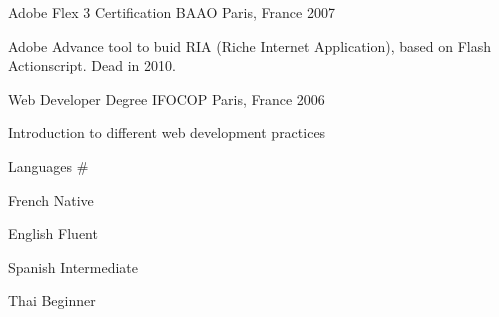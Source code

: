 

\begin{cventries}

  \cventry
    {Adobe Flex 3 Certification} %
    {BAAO} %
    {Paris, France} %
    {2007} %
    {
      \begin{cvitems} %
        \item {Adobe Advance tool to buid RIA (Riche Internet Application), based on Flash Actionscript. Dead in 2010.}
      \end{cvitems}
    }
    { } %
  \cventry
    {Web Developer Degree} %
    {IFOCOP} %
    {Paris, France} %
    {2006} %
    {
      \begin{cvitems} %
        \item {Introduction to different web development practices}
      \end{cvitems}
    }
    { } %

  \cventry
    {Languages} %
    {\#} %
    { } %
    { } %
    {
      \begin{cvitems} %
        \item {French Native}
        \item {English Fluent}
        \item {Spanish Intermediate}
        \item {Thai Beginner}
      \end{cvitems}
    }
    { } %

\end{cventries}
